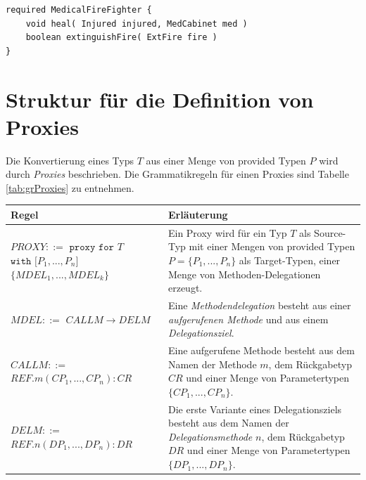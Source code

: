 \documentclass[a4paper,12pt]{article}
\begin{document}
\begin{lstlisting}[caption={Bibliothek \emph{ExampLe} von Typen},captionpos=b, style = dsl]
required MedicalFireFighter {
	void heal( Injured injured, MedCabinet med )
	boolean extinguishFire( ExtFire fire )	
}
\end{lstlisting}\label{lst:libEx}

\newpage

\section{Struktur für die Definition von Proxies}\label{sec:proxygram}
Die Konvertierung eines Typs $T$ aus einer Menge von provided Typen $P$ wird durch \emph{Proxies} beschrieben. Die Grammatikregeln für einen Proxies sind Tabelle \ref{tab:grProxies} zu entnehmen.
\begin{table}[H]
\centering
\begin{tabular}{|p{5cm}|p{9cm}|}
\hline
\hline
\centering\textbf{Regel} & \textbf{Erläuterung} \\
\hline
\hline
$\mathit{PROXY} ::=$\newline
$\texttt{proxy } \texttt{for } T$\newline
$ \texttt{with [}\mathit{P_1},...,\mathit{P_n}\texttt{]}$ \newline
$\texttt{\{}\mathit{MDEL_1},...,\mathit{MDEL_k} \texttt{\}}$
 & Ein Proxy wird für ein Typ $T$ als Source-Typ mit einer Mengen von provided Typen $P = \{P_1,...,P_n\}$ als Target-Typen, einer Menge von Methoden-Delegationen erzeugt.\\
\hline
$\mathit{MDEL} ::=$\newline
$CALLM \rightarrow DELM $  & Eine \emph{Methodendelegation} besteht aus einer \emph{aufgerufenen Methode} und aus einem \emph{Delegationsziel}.\\
\hline
$\mathit{CALLM} ::=$\newline 
$\mathit{REF}.\mathit{m(\mathit{CP_1},...,\mathit{CP_n}):CR} $  & Eine aufgerufene Methode besteht aus dem Namen der Methode $m$, dem Rückgabetyp $\mathit{CR}$ und einer Menge von Parametertypen $\{\mathit{CP_1},...,\mathit{CP_n}\}$.\\
\hline
$\mathit{DELM} ::=$\newline 
$\mathit{REF}.\mathit{n(\mathit{DP_1},...,\mathit{DP_n}):DR} $  
& Die erste Variante eines Delegationsziels besteht aus  dem Namen der \emph{Delegationsmethode} $n$, dem Rückgabetyp $\mathit{DR}$ und einer Menge von Parametertypen $\{\mathit{DP_1},...,\mathit{DP_n}\}$.\\

\end{tabular}
\end{table}
\end{document}
